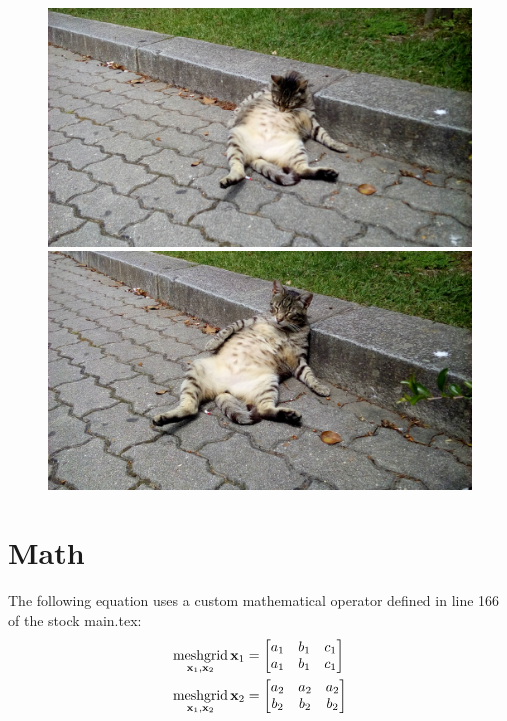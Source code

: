 \begin{figure}
\centering
\begin{minipage}{.49\textwidth}
  \centering
  \includegraphics[width=.95\linewidth]{Figures/ChapterTemplate/20160517_123603.jpg}
\end{minipage}%
\hfill
\begin{minipage}{.49\textwidth}
  \centering
  \includegraphics[width=.95\linewidth]{Figures/ChapterTemplate/20160517_123609.jpg}
\end{minipage}
\end{figure}

\section{Math}


The following equation uses a custom mathematical operator defined in line 166 of the stock main.tex:
\begin{equation}
\begin{aligned}
			\operatorname*{meshgrid}_{\mathbf{x}_{1},\mathbf{x}_{2}}\mathbf{x}_{1}&=\begin{bmatrix}a_{1} & b_{1} & c_{1}\\
a_{1} & b_{1} & c_{1}
\end{bmatrix}\\
			\operatorname*{meshgrid}_{\mathbf{x}_{1},\mathbf{x}_{2}}\mathbf{x}_{2}&=\begin{bmatrix}a_{2} & a_{2} & a_{2}\\
b_{2} & b_{2} & b_{2}
\end{bmatrix}
\end{aligned}
\end{equation}

